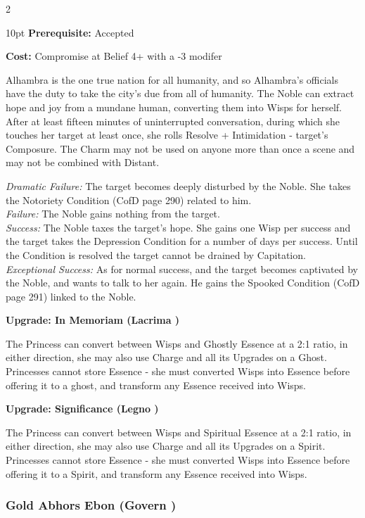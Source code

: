 \begin{multicols}{2}
\begin{myindentpar}{10pt}
\noindent \textbf{Prerequisite:} Accepted

\noindent \textbf{Cost:} Compromise at Belief 4+ with a -3 modifer

Alhambra is the one true nation for all humanity, and so Alhambra's officials have the duty to take the city's due from all of humanity. The Noble can extract hope and joy from a
mundane human, converting them into Wisps for herself. After at least fifteen minutes of uninterrupted conversation, during which she touches her target at least once, she rolls Resolve + Intimidation - target’s Composure. The Charm may not be used on anyone more than once a scene and may not be combined with Distant.

\emph{Dramatic Failure:} The target becomes deeply disturbed by the Noble. She takes the Notoriety Condition (CofD page 290) related to him.\\
\emph{Failure:} The Noble gains nothing from the target.\\
\emph{Success:} The Noble taxes the target’s hope. She gains one Wisp per success and the target takes the Depression Condition for a number of days per success. Until the Condition is resolved the target cannot be drained by Capitation.\\ 
\emph{Exceptional Success:} As for normal success, and the target becomes captivated by the Noble, and wants to talk to her again. He gains the Spooked Condition (CofD page 291) linked to the Noble.

\textbf{Upgrade: In Memoriam (Lacrima \textbullet\textbullet)}

The Princess can convert between Wisps and Ghostly Essence at a 2:1 ratio, in either direction, she may also use Charge and all its Upgrades on a Ghost. Princesses cannot store Essence - she must converted Wisps into Essence before offering it to a ghost, and transform any Essence received into Wisps.

\textbf{Upgrade: Significance (Legno \textbullet\textbullet)}

The Princess can convert between Wisps and Spiritual Essence at a 2:1 ratio, in either direction, she may also use Charge and all its Upgrades on a Spirit. Princesses cannot store Essence - she must converted Wisps into Essence before offering it to a Spirit, and transform any Essence received into Wisps.\end{myindentpar}

\subsubsection*{Gold Abhors Ebon (Govern \textbullet\textbullet)}


\end{multicols}
